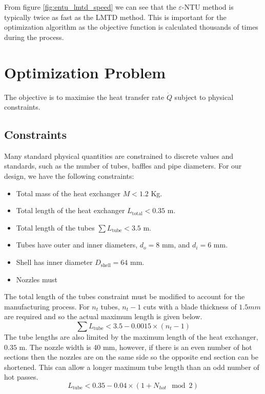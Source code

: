 \documentclass{article}
\begin{document}
From figure \ref{fig:entu_lmtd_speed} we can see that the $\varepsilon$-NTU method is typically twice as fast as the LMTD method.
This is important for the optimization algorithm as the objective function is calculated thousands of times during the process.


\section{Optimization Problem}

The objective is to maximise the heat transfer rate $\dot{Q}$ subject to physical constraints.

\subsection{Constraints}

Many standard physical quantities are constrained to discrete values and standards, such as the number of tubes, baffles and pipe diameters.
For our design, we have the following constraints:
\begin{itemize}
  \item Total mass of the heat exchanger $M < 1.2$ Kg.
  \item Total length of the heat exchanger $L_{\text{total}} < 0.35$ m.
  \item Total length of the tubes $\sum L_{\text{tube}} < 3.5$ m.
  \item Tubes have outer and inner diameters, $d_{o} = 8$ mm, and $d_{i} = 6$ mm.
  \item Shell has inner diameter $D_{\text{shell}} = 64$ mm.
  \item Nozzles must 
\end{itemize}

The total length of the tubes constraint must be modified to account for the manufacturing process.
For $n_t$ tubes, $n_t - 1$ cuts with a blade thickness of $1.5 mm$ are required and so the actual maximum length is given below.
\begin{equation}
  \sum L_\text{tube} < 3.5 - 0.0015 \times (n_t - 1)
\end{equation}
The tube lengths are also limited by the maximum length of the heat exchanger, $0.35$ m.
The nozzle width is 40 mm, however, if there is an even number of hot sections then the nozzles are on the same side so the opposite end section can be shortened.
This can allow a longer maximum tube length than an odd number of hot passes.
\begin{equation}
  L_\text{tube} < 0.35 - 0.04 \times (1 + N_{hot}\mod 2)
\end{equation}
\end{document}
